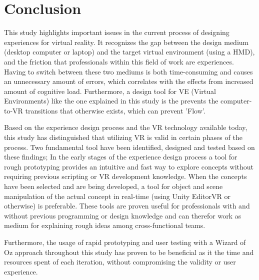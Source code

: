 \chapter{Conclusion}
This study highlights important issues in the current process of designing experiences for virtual reality. It recognizes the gap between the design medium (desktop computer or laptop) and the target virtual environment (using a HMD), and the friction that professionals within this field of work are experiences. Having to switch between these two mediums is both time-consuming and causes an unnecessary amount of errors, which correlates with the effects from increased amount of cognitive load. Furthermore, a design tool for VE (Virtual Environments) like the one explained in this study is the prevents the computer-to-VR transitions that otherwise exists, which can prevent 'Flow'.

Based on the experience design process and the VR technology available today, this study has distinguished that utilizing VR is valid in certain phases of the process. Two fundamental tool have been identified, designed and tested based on these findings; In the early stages of the experience design process a tool for rough prototyping provides an intuitive and fast way to explore concepts without requiring previous scripting or VR development knowledge. When the concepts have been selected and are being developed, a tool for object and scene manipulation of the actual concept in real-time (using Unity EditorVR or otherwise) is preferable. These tools are proven useful for professionals with and without previous programming or design knowledge and can therefor work as medium for explaining rough ideas among cross-functional teams.

Furthermore, the usage of rapid prototyping and user testing with a Wizard of Oz approach throughout this study has proven to be beneficial as it the time and resources spent of each iteration, without compromising the validity or user experience.

